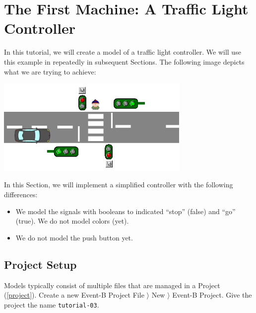 \section{The First Machine: A Traffic Light Controller}
\label{tutorial_03}



In this tutorial, we will create a model of a traffic light controller.  We will use this example in repeatedly in subsequent Sections.  The following image depicts what we are trying to achieve:

\begin{center}
	\includegraphics[width=0.7\textwidth]{img/tutorial/trafficlight.png}
\end{center}

In this Section, we will implement a simplified controller with the following differences:
\begin{itemize}
	\item We model the signals with booleans to indicated ``stop'' (false) and ``go'' (true).  We do not model colors (yet).
	\item We do not model the push button yet.
\end{itemize}

\subsection{Project Setup}

Models typically consist of multiple files that are managed in a Project (\ref{project}).  Create a new Event-B Project \textsf{File $\rangle$ New $\rangle$ Event-B Project}.  Give the project the name \texttt{tutorial-03}.


